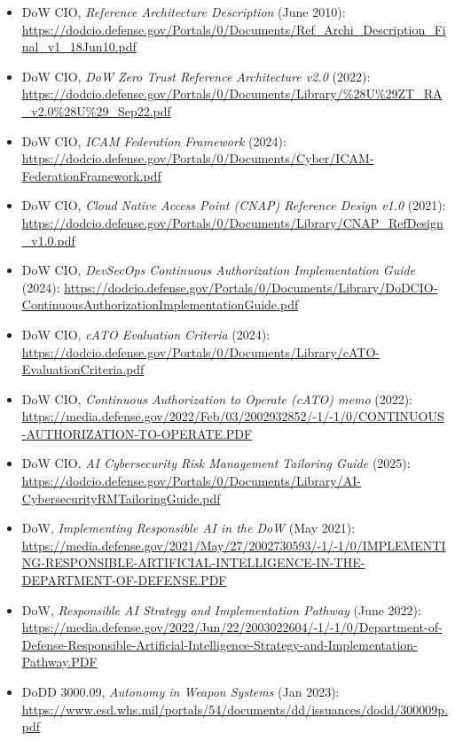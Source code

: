 \documentclass[11pt]{article}
\begin{document}
\begin{itemize}
\tightlist
\item
  DoW CIO, \emph{Reference Architecture Description} (June 2010):
  \url{https://dodcio.defense.gov/Portals/0/Documents/Ref_Archi_Description_Final_v1_18Jun10.pdf}\\
\item
  DoW CIO, \emph{DoW Zero Trust Reference Architecture v2.0} (2022):
  \url{https://dodcio.defense.gov/Portals/0/Documents/Library/\%28U\%29ZT_RA_v2.0\%28U\%29_Sep22.pdf}\\
\item
  DoW CIO, \emph{ICAM Federation Framework} (2024):
  \url{https://dodcio.defense.gov/Portals/0/Documents/Cyber/ICAM-FederationFramework.pdf}\\
\item
  DoW CIO, \emph{Cloud Native Access Point (CNAP) Reference Design v1.0}
  (2021):
  \url{https://dodcio.defense.gov/Portals/0/Documents/Library/CNAP_RefDesign_v1.0.pdf}\\
\item
  DoW CIO, \emph{DevSecOps Continuous Authorization Implementation
  Guide} (2024):
  \url{https://dodcio.defense.gov/Portals/0/Documents/Library/DoDCIO-ContinuousAuthorizationImplementationGuide.pdf}\\
\item
  DoW CIO, \emph{cATO Evaluation Criteria} (2024):
  \url{https://dodcio.defense.gov/Portals/0/Documents/Library/cATO-EvaluationCriteria.pdf}\\
\item
  DoW CIO, \emph{Continuous Authorization to Operate (cATO) memo}
  (2022):
  \url{https://media.defense.gov/2022/Feb/03/2002932852/-1/-1/0/CONTINUOUS-AUTHORIZATION-TO-OPERATE.PDF}\\
\item
  DoW CIO, \emph{AI Cybersecurity Risk Management Tailoring Guide}
  (2025):
  \url{https://dodcio.defense.gov/Portals/0/Documents/Library/AI-CybersecurityRMTailoringGuide.pdf}\\
\item
  DoW, \emph{Implementing Responsible AI in the DoW} (May 2021):
  \url{https://media.defense.gov/2021/May/27/2002730593/-1/-1/0/IMPLEMENTING-RESPONSIBLE-ARTIFICIAL-INTELLIGENCE-IN-THE-DEPARTMENT-OF-DEFENSE.PDF}\\
\item
  DoW, \emph{Responsible AI Strategy and Implementation Pathway} (June
  2022):
  \url{https://media.defense.gov/2022/Jun/22/2003022604/-1/-1/0/Department-of-Defense-Responsible-Artificial-Intelligence-Strategy-and-Implementation-Pathway.PDF}\\
\item
  DoDD 3000.09, \emph{Autonomy in Weapon Systems} (Jan 2023):
  \url{https://www.esd.whs.mil/portals/54/documents/dd/issuances/dodd/300009p.pdf}
\end{itemize}
\end{document}
